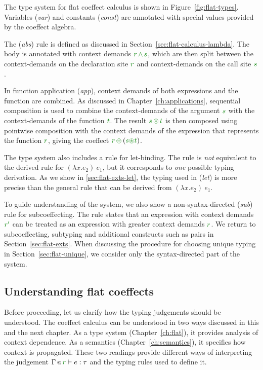 The type system for flat coeffect calculus is shown in Figure~\ref{fig:flat-types}. Variables
(\emph{var}) and constants (\emph{const}) are annotated with special values provided by the
coeffect algebra.

The (\emph{abs}) rule is defined as discussed in Section~\ref{sec:flat-calculus-lambda}. The
body is annotated with context demands $\cclrd{r} \,\czip\, \cclrd{s}$, which are then split
between the context-demands on the declaration site $\cclrd{r}$ and context-demands on
the call site $\cclrd{s}$.

In function application (\emph{app}), context demands of both expressions and the
function are combined. As discussed in Chapter~\ref{ch:applications}, sequential composition
is used to combine the context-demands of the argument $\cclrd{s}$ with the context-demands
of the function $\cclrd{t}$. The result $\cclrd{s}\,\cseq\,\cclrd{t}$ is then composed using
pointwise composition with the context demands of the expression that represents the function
$\cclrd{r}$, giving the coeffect $\cclrd{r}\,\cpar\,(\cclrd{s}\cseq\cclrd{t})$.

The type system also includes a rule for let-binding. The rule is \emph{not} equivalent to the
derived rule for $(\lambda x.e_2)~e_1$, but it corresponds to \emph{one} possible typing
derivation. As we show in \ref{sec:flat-exts-let}, the typing used in (\emph{let}) is more
precise than the general rule that can be derived from $(\lambda x.e_2)~e_1$.

To guide understanding of the system, we also show a non-syntax-directed (\emph{sub}) rule for
subcoeffecting. The rule states that an expression with context demands $\cclrd{r'}$ can be
treated as an expression with greater context demands $\cclrd{r}$. We return to subcoeffecting,
subtyping and additional constructs such as pairs in Section~\ref{sec:flat-exts}. When
discussing the procedure for choosing unique typing in Section~\ref{sec:flat-unique}, we consider
only the syntax-directed part of the system.


\subsection{Understanding flat coeffects}
\label{sec:flat-calculus-understanding}

Before proceeding, let us clarify how the typing judgements should be understood. The coeffect
calculus can be understood in two ways discussed in this and the next chapter. As a type system
(Chapter~\ref{ch:flat}), it provides analysis of context dependence. As a semantics
(Chapter~\ref{ch:semantics}), it specifies how context is propagated. These two readings provide
different ways of interpreting the judgement $\coctx{\Gamma}{\cclrd{r}} \vdash e : \tau$ and the
typing rules used to define it.

